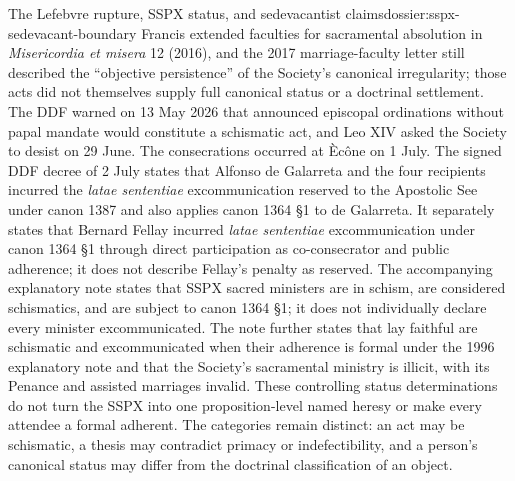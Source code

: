 \begin{heresydossier}{The Lefebvre rupture, SSPX status, and sedevacantist claims}{dossier:sspx-sedevacant-boundary}
\aftermathfield Francis extended faculties for sacramental absolution in \emph{Misericordia et misera} 12 (2016), and the 2017 marriage-faculty letter still described the ``objective persistence'' of the Society's canonical irregularity; those acts did not themselves supply full canonical status or a doctrinal settlement. The DDF warned on 13 May 2026 that announced episcopal ordinations without papal mandate would constitute a schismatic act, and Leo XIV asked the Society to desist on 29 June. The consecrations occurred at \`Ec\^one on 1 July. The signed DDF decree of 2 July states that Alfonso de Galarreta and the four recipients incurred the \emph{latae sententiae} excommunication reserved to the Apostolic See under canon 1387 and also applies canon 1364 \S1 to de Galarreta. It separately states that Bernard Fellay incurred \emph{latae sententiae} excommunication under canon 1364 \S1 through direct participation as co-consecrator and public adherence; it does not describe Fellay's penalty as reserved. The accompanying explanatory note states that SSPX sacred ministers are in schism, are considered schismatics, and are subject to canon 1364 \S1; it does not individually declare every minister excommunicated. The note further states that lay faithful are schismatic and excommunicated when their adherence is formal under the 1996 explanatory note and that the Society's sacramental ministry is illicit, with its Penance and assisted marriages invalid. These controlling status determinations do not turn the SSPX into one proposition-level named heresy or make every attendee a formal adherent. The categories remain distinct: an act may be schismatic, a thesis may contradict primacy or indefectibility, and a person's canonical status may differ from the doctrinal classification of an object.
\end{heresydossier}

